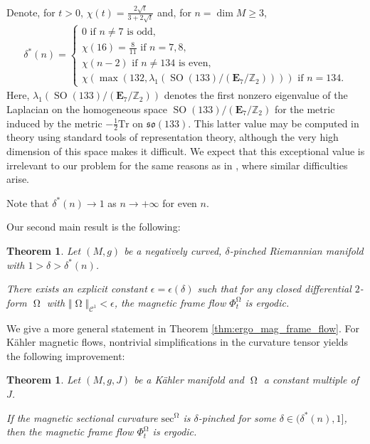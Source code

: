 \documentclass[12pt]{amsart}
\numberwithin{numbering}{section}
\theoremstyle{plain}
\newtheorem{thm}[numbering]{Theorem}
\theoremstyle{definition}
\theoremstyle{remark}
\numberwithin{equation}{section}
\DeclareMathOperator{\SO}{SO}
\DeclareMathOperator{\mg}{\Omega}
\newcommand{\Z}{\mathbb{Z}}
\newcommand{\frk}[1]{\mathfrak{#1}}
\begin{document}
Denote, for $t > 0$, $\chi(t) = \frac{2\sqrt{t}}{3 + 2\sqrt{t}}$ and, for $n = \dim M \geq 3$, 
\begin{align*}
\delta^*(n) = 
\begin{cases*}
   0 \text{ if $n \neq 7$ is odd,} \\ 
   \chi(16) = \frac{8}{11} \text{ if $n = 7, 8$,} \\
   \chi(n-2) \text{ if $n \neq 134$ is even,} \\ 
   \chi(\max(132, \lambda_1(\SO(133) / (\mathbf{E}_7 / \Z_2)))) \text{ if $n = 134$}.
\end{cases*}
\end{align*}
Here, $\lambda_1(\SO(133) / (\mathbf{E}_7 / \Z_2))$ denotes the first nonzero eigenvalue of the Laplacian on the homogeneous space $\SO(133) / (\mathbf{E}_7 / \Z_2)$ for the metric induced by the metric $- \frac{1}{2} \mathrm{Tr}$ on $\frk{so}(133)$. This latter value may be computed in theory using standard tools of representation theory, although the very high dimension of this space makes it difficult. We expect that this exceptional value is irrelevant to our problem for the same reasons as in \cite{cekic2024frame,}, where similar difficulties arise.

Note that $\delta^*(n) \to 1$ as $n \to +\infty$ for even $n$.

\smallskip

Our second main result is the following:

\begin{thm} \label{thm:ergo_mag_frame_flow_intro}
Let $(M, g)$ be a negatively curved, $\delta$-pinched Riemannian manifold with $1 > \delta > \delta^*(n)$. 

There exists an \emph{explicit} constant $\epsilon = \epsilon(\delta)$ such that for any \emph{closed} differential $2$-form $\mg$ with $\Vert \mg \Vert_{\mathcal{C}^1} < \epsilon$, the magnetic frame flow $\Phi_t^{\mg}$ is ergodic.
\end{thm}

We give a more general statement in Theorem \ref{thm:ergo_mag_frame_flow}. For Kähler magnetic flows, nontrivial simplifications in the curvature tensor yields the following improvement:

\begin{thm} \label{thm:ergo_kahler_frame_flow_intro}
Let $(M, g, J)$ be a Kähler manifold and $\mg$ a constant multiple of $J$. 

If the magnetic sectional curvature $\mathrm{sec}^{\mg}$ is $\delta$-pinched for some $\delta \in (\delta^*(n), 1]$, then the magnetic frame flow $\Phi_t^{\mg}$ is ergodic.
\end{thm}
\end{document}
